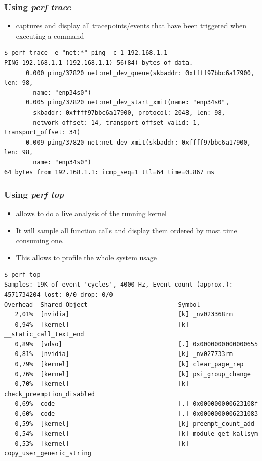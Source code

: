 \begin{frame}[fragile]
  \frametitle{Using {\em perf trace} }
  \begin{itemize}
    \item {} captures and display all tracepoints/events that
          have been triggered when executing a command
  \end{itemize}

  \begin{block}{}
    \begin{verbatim}
$ perf trace -e "net:*" ping -c 1 192.168.1.1
PING 192.168.1.1 (192.168.1.1) 56(84) bytes of data.
      0.000 ping/37820 net:net_dev_queue(skbaddr: 0xffff97bbc6a17900, len: 98,
        name: "enp34s0")
      0.005 ping/37820 net:net_dev_start_xmit(name: "enp34s0",
        skbaddr: 0xffff97bbc6a17900, protocol: 2048, len: 98,
        network_offset: 14, transport_offset_valid: 1, transport_offset: 34)
      0.009 ping/37820 net:net_dev_xmit(skbaddr: 0xffff97bbc6a17900, len: 98,
        name: "enp34s0")
64 bytes from 192.168.1.1: icmp_seq=1 ttl=64 time=0.867 ms
    \end{verbatim}
  \end{block}
\end{frame}

\begin{frame}[fragile]
  \frametitle{Using {\em perf top} }
  \begin{itemize}
    \item {} allows to do a live analysis of the running kernel
    \item It will sample all function calls and display them ordered by most
          time consuming one.
    \item This allows to profile the whole system usage
  \end{itemize}

  \begin{block}{}
    \begin{verbatim}
$ perf top
Samples: 19K of event 'cycles', 4000 Hz, Event count (approx.): 4571734204 lost: 0/0 drop: 0/0
Overhead  Shared Object                         Symbol
   2,01%  [nvidia]                              [k] _nv023368rm
   0,94%  [kernel]                              [k] __static_call_text_end
   0,89%  [vdso]                                [.] 0x0000000000000655
   0,81%  [nvidia]                              [k] _nv027733rm
   0,79%  [kernel]                              [k] clear_page_rep
   0,76%  [kernel]                              [k] psi_group_change
   0,70%  [kernel]                              [k] check_preemption_disabled
   0,69%  code                                  [.] 0x000000000623108f
   0,60%  code                                  [.] 0x0000000006231083
   0,59%  [kernel]                              [k] preempt_count_add
   0,54%  [kernel]                              [k] module_get_kallsym
   0,53%  [kernel]                              [k] copy_user_generic_string
    \end{verbatim}
  \end{block}
\end{frame}


